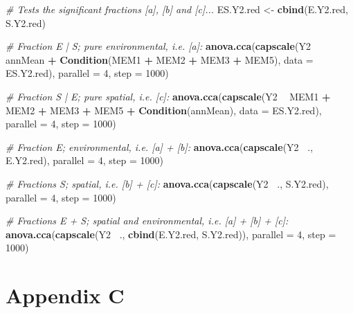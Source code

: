 \documentclass[10pt,A4,]{article}
\newenvironment{Shaded}{\begin{snugshade}}{\end{snugshade}}
\newcommand{\KeywordTok}[1]{\textcolor[rgb]{0.13,0.29,0.53}{\textbf{#1}}}
\newcommand{\DataTypeTok}[1]{\textcolor[rgb]{0.13,0.29,0.53}{#1}}
\newcommand{\DecValTok}[1]{\textcolor[rgb]{0.00,0.00,0.81}{#1}}
\newcommand{\StringTok}[1]{\textcolor[rgb]{0.31,0.60,0.02}{#1}}
\newcommand{\CommentTok}[1]{\textcolor[rgb]{0.56,0.35,0.01}{\textit{#1}}}
\newcommand{\OperatorTok}[1]{\textcolor[rgb]{0.81,0.36,0.00}{\textbf{#1}}}
\newcommand{\NormalTok}[1]{#1}
\begin{document}
\begin{Shaded}
\begin{Highlighting}[]
\CommentTok{# Tests the significant fractions [a], [b] and [c]...}
\NormalTok{ES.Y2.red <-}\StringTok{ }\KeywordTok{cbind}\NormalTok{(E.Y2.red, S.Y2.red)}

\CommentTok{# Fraction E | S; pure environmental, i.e. [a]:}
\KeywordTok{anova.cca}\NormalTok{(}\KeywordTok{capscale}\NormalTok{(Y2 }\OperatorTok{~}\StringTok{ }\NormalTok{annMean }\OperatorTok{+}
\StringTok{                  }\KeywordTok{Condition}\NormalTok{(MEM1 }\OperatorTok{+}\StringTok{ }\NormalTok{MEM2 }\OperatorTok{+}\StringTok{ }\NormalTok{MEM3 }\OperatorTok{+}\StringTok{ }\NormalTok{MEM5),}
                \DataTypeTok{data =}\NormalTok{ ES.Y2.red), }\DataTypeTok{parallel =} \DecValTok{4}\NormalTok{, }\DataTypeTok{step =} \DecValTok{1000}\NormalTok{)}

\CommentTok{# Fraction S | E; pure spatial, i.e. [c]:}
\KeywordTok{anova.cca}\NormalTok{(}\KeywordTok{capscale}\NormalTok{(Y2 }\OperatorTok{~}\StringTok{ }\NormalTok{MEM1 }\OperatorTok{+}\StringTok{ }\NormalTok{MEM2 }\OperatorTok{+}\StringTok{ }\NormalTok{MEM3 }\OperatorTok{+}\StringTok{ }\NormalTok{MEM5 }\OperatorTok{+}
\StringTok{                  }\KeywordTok{Condition}\NormalTok{(annMean),}
                \DataTypeTok{data =}\NormalTok{ ES.Y2.red), }\DataTypeTok{parallel =} \DecValTok{4}\NormalTok{, }\DataTypeTok{step =} \DecValTok{1000}\NormalTok{)}

\CommentTok{# Fraction E; environmental, i.e. [a] + [b]:}
\KeywordTok{anova.cca}\NormalTok{(}\KeywordTok{capscale}\NormalTok{(Y2 }\OperatorTok{~}\NormalTok{., E.Y2.red), }\DataTypeTok{parallel =} \DecValTok{4}\NormalTok{, }\DataTypeTok{step =} \DecValTok{1000}\NormalTok{)}

\CommentTok{# Fractions S; spatial, i.e. [b] + [c]:}
\KeywordTok{anova.cca}\NormalTok{(}\KeywordTok{capscale}\NormalTok{(Y2 }\OperatorTok{~}\NormalTok{., S.Y2.red), }\DataTypeTok{parallel =} \DecValTok{4}\NormalTok{, }\DataTypeTok{step =} \DecValTok{1000}\NormalTok{)}

\CommentTok{# Fractions E + S; spatial and environmental, i.e. [a] + [b] + [c]:}
\KeywordTok{anova.cca}\NormalTok{(}\KeywordTok{capscale}\NormalTok{(Y2 }\OperatorTok{~}\NormalTok{., }\KeywordTok{cbind}\NormalTok{(E.Y2.red, S.Y2.red)), }\DataTypeTok{parallel =} \DecValTok{4}\NormalTok{, }\DataTypeTok{step =} \DecValTok{1000}\NormalTok{)}
\end{Highlighting}
\end{Shaded}

\newpage

\section*{Appendix C}
\end{document}
